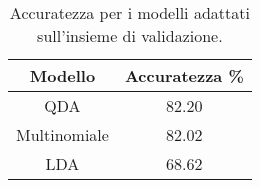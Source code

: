 \begin{table}[H]
\centering
\caption{Accuratezza per i modelli adattati sull'insieme di validazione.}
\begin{tabular}{cc}
\toprule
      Modello &  Accuratezza \% \\
\midrule
          QDA &          82.20 \\
 Multinomiale &          82.02 \\
          LDA &          68.62 \\
\bottomrule
\end{tabular}
\label{tab:acc_pen}
\end{table}